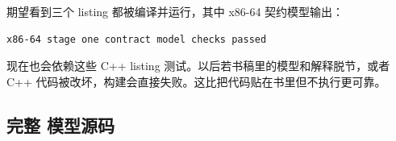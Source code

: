 期望看到三个 listing 都被编译并运行，其中 x86-64 契约模型输出：

\begin{lstlisting}
x86-64 stage one contract model checks passed
\end{lstlisting}

 现在也会依赖这些 C++ listing 测试。以后若书稿里的模型和解释脱节，或者 C++ 代码被改坏，构建会直接失败。这比把代码贴在书里但不执行更可靠。

\subsection{完整  模型源码}


